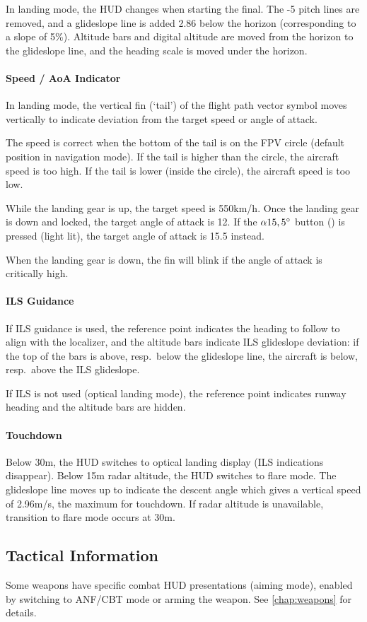 In landing mode, the HUD changes when starting the final.
The -5\textdegree{} pitch lines are removed,
and a glideslope line is added 2.86\textdegree{} below the horizon
(corresponding to a slope of 5\%).
Altitude bars and digital altitude are moved from the horizon to the glideslope line,
and the heading scale is moved under the horizon.

\paragraph{Speed / AoA Indicator}
In landing mode, the vertical fin (`tail') of the flight path vector symbol
moves vertically to indicate deviation from the target speed or angle of attack.

The speed is correct when the bottom of the tail is on the FPV circle
(default position in navigation mode).
If the tail is higher than the circle, the aircraft speed is too high.
If the tail is lower (inside the circle), the aircraft speed is too low.

While the landing gear is up, the target speed is 550km/h.
Once the landing gear is down and locked, the target angle of attack is 12\textdegree{}.
If the $\alpha 15,5\degree$ button
() is pressed (light lit),
the target angle of attack is 15.5\textdegree{} instead.

When the landing gear is down, the fin will blink if the angle of attack is critically high.

\paragraph{ILS Guidance}
If ILS guidance is used, the reference point indicates the heading to follow to align with the localizer,
and the altitude bars indicate ILS glideslope deviation:
if the top of the bars is above, resp.\ below the glideslope line,
the aircraft is below, resp.\ above the ILS glideslope.

If ILS is not used (optical landing mode),
the reference point indicates runway heading and the altitude bars are hidden.

\paragraph{Touchdown}
Below 30m, the HUD switches to optical landing display (ILS indications disappear).
Below 15m radar altitude, the HUD switches to flare mode.
The glideslope line moves up to indicate the descent angle
which gives a vertical speed of 2.96m/s, the maximum for touchdown.
If radar altitude is unavailable, transition to flare mode occurs at 30m.

\subsection{Tactical Information}
Some weapons have specific combat HUD presentations (aiming mode),
enabled by switching to ANF/CBT mode or arming the weapon.
See \cref{chap:weapons} for details.
